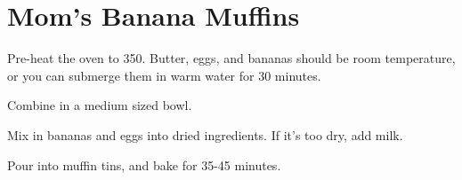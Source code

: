 \section{Mom's Banana Muffins}
\begin{recipe}


Pre-heat the oven to 350\degree{}. 
Butter, eggs, and bananas should be room temperature, or you
can submerge them in warm water for 30 minutes. 


Combine in a medium sized bowl.


Mix in bananas and eggs into dried ingredients. If it's 
too dry, add milk. 

Pour into muffin tins, and bake for 35-45 minutes. 

\end{recipe}
